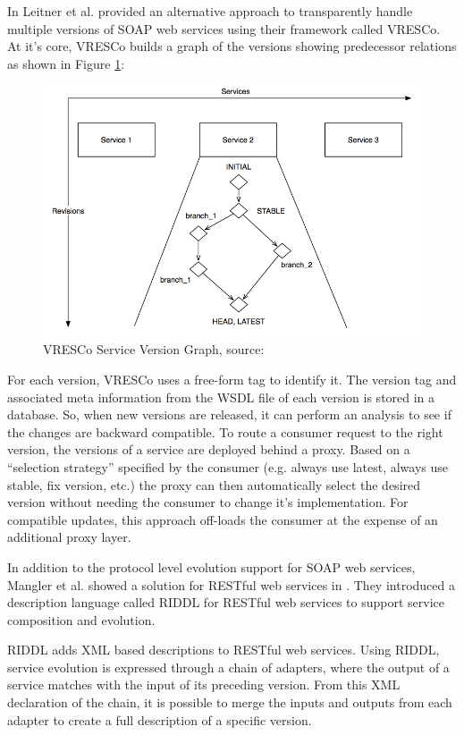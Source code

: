 \documentclass[runningheads,a4paper]{llncs}
\begin{document}
In \cite{leitner2008end} Leitner et al. provided an alternative approach to transparently handle multiple versions of SOAP web services using their framework called VRESCo. At it’s core, VRESCo builds a graph of the versions showing predecessor relations as shown in Figure \ref{fig:vresco}:

\begin{figure}[bt]
  \centering
  \includegraphics[width=\textwidth]{vresco.png}
    \caption{VRESCo Service Version Graph, source: \cite{leitner2008end}}
  \label{fig:vresco}
\end{figure}


For each version, VRESCo uses a free-form tag to identify it. The version tag and associated meta information from the WSDL file of each version is stored in a database. So, when new versions are released, it can perform an analysis to see if the changes are backward compatible. To route a consumer request to the right version, the versions of a service are deployed behind a proxy. Based on a ``selection strategy'' specified by the consumer (e.g. always use latest, always use stable, fix version, etc.) the proxy can then automatically select the desired version without needing the consumer to change it’s implementation. For compatible updates, this approach off-loads the consumer at the expense of an additional proxy layer.

In addition to the protocol level evolution support for SOAP web services, Mangler et al. showed a solution for RESTful web services in \cite{mangler2010origin}. They introduced a description language called RIDDL for RESTful web services to support service composition and evolution.

RIDDL adds XML based descriptions to RESTful web services. Using RIDDL, service evolution is expressed through a chain of adapters, where the output of a service matches with the input of its preceding version. From this XML declaration of the chain, it is possible to merge the inputs and outputs from each adapter to create a full description of a specific version.
\end{document}
